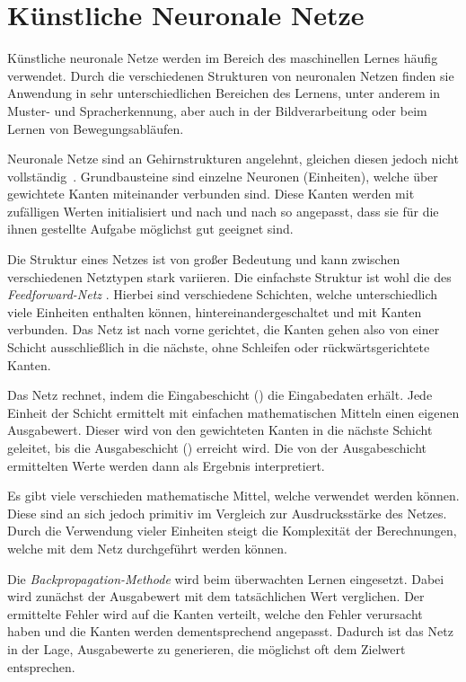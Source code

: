 \section{Künstliche Neuronale Netze}

Künstliche neuronale Netze werden im Bereich des maschinellen Lernes häufig verwendet. Durch die verschiedenen Strukturen von neuronalen Netzen finden sie Anwendung in sehr unterschiedlichen Bereichen des Lernens, unter anderem in Muster- und Spracherkennung, aber auch in der Bildverarbeitung oder beim Lernen von Bewegungsabläufen.

Neuronale Netze sind an Gehirnstrukturen angelehnt, gleichen diesen jedoch nicht vollständig~\cite{web:misconceptions-neural-network}.
Grundbausteine sind einzelne Neuronen (Einheiten), welche über gewichtete Kanten miteinander verbunden sind. Diese Kanten werden mit zufälligen Werten initialisiert und nach und nach so angepasst, dass sie für die ihnen gestellte Aufgabe möglichst gut geeignet sind.

Die Struktur eines Netzes ist von großer Bedeutung und kann zwischen verschiedenen Netztypen stark variieren. Die einfachste Struktur ist wohl die des \emph{Feedforward-Netz} \citep{feedforward}. Hierbei sind verschiedene Schichten, welche unterschiedlich viele Einheiten enthalten können, hintereinandergeschaltet und mit Kanten verbunden. Das Netz ist nach vorne gerichtet, die Kanten gehen also von einer Schicht ausschließlich in die nächste, ohne Schleifen oder rückwärtsgerichtete Kanten.

Das Netz rechnet, indem die Eingabeschicht () die Eingabedaten erhält. Jede Einheit der Schicht ermittelt mit einfachen mathematischen Mitteln einen eigenen Ausgabewert. Dieser wird von den gewichteten Kanten in die nächste Schicht geleitet, bis die Ausgabeschicht () erreicht wird. Die von der Ausgabeschicht ermittelten Werte werden dann als Ergebnis interpretiert.

Es gibt viele verschieden mathematische Mittel, welche verwendet werden können. Diese sind an sich jedoch primitiv im Vergleich zur Ausdrucksstärke des Netzes. Durch die Verwendung vieler Einheiten steigt die Komplexität der Berechnungen, welche mit dem Netz durchgeführt werden können.

Die \emph{Backpropagation-Methode} wird beim überwachten Lernen eingesetzt. Dabei wird zunächst der Ausgabewert mit dem tatsächlichen Wert verglichen. Der ermittelte Fehler wird auf die Kanten verteilt, welche den Fehler verursacht haben und die Kanten werden dementsprechend angepasst. Dadurch ist das Netz in der Lage, Ausgabewerte zu generieren, die möglichst oft dem Zielwert entsprechen.

